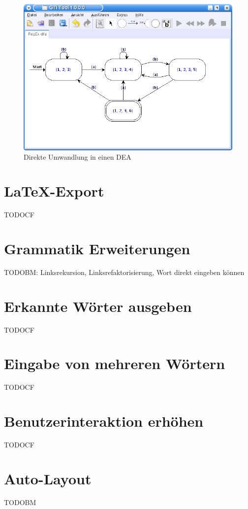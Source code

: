 \begin{figure}[h!]
\begin{center}
\includegraphics[width=12cm]{../images/regex_dfa.png}
\caption{Direkte Umwandlung in einen DEA}
\label{FigureRegExDFA}
\end{center}
\end{figure}


\section{\LaTeX-Export}

TODOCF


\section{Grammatik Erweiterungen}

TODOBM: Linksrekursion, Linksrefaktorisierung, Wort direkt eingeben können


\section{Erkannte Wörter ausgeben}

TODOCF


\section{Eingabe von mehreren Wörtern}

TODOCF


\section{Benutzerinteraktion erhöhen}

TODOCF


\section{Auto-Layout}\label{PerspectiveAutoLayout}

TODOBM
